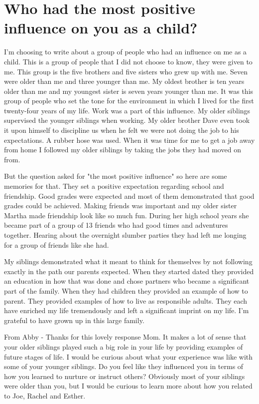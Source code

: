 \section{Who had the most positive influence on you as a child?}
I'm choosing to write about a group of people who had an influence on me as a child.
This is a group of people that I did not choose to know, they were given to me.
This group is the five brothers and five sisters who grew up with me.
Seven were older than me and three younger than me.
My oldest brother is ten years older than me and my youngest sister is seven years younger than me.
It was this group of people who set the tone for the environment in which I lived for the first twenty-four years of my life.
Work was a part of this influence.
My older siblings supervised the younger siblings when working.
My older brother Dave even took it upon himself to discipline us when he felt we were not doing the job to his expectations.
A rubber hose was used.
When it was time for me to get a job away from home I followed my older siblings by taking the jobs they had moved on from.

But the question asked for "the most positive influence" so here are some memories for that.
They set a positive expectation regarding school and friendship.
Good grades were expected and most of them demonstrated that good grades could be achieved.
Making friends was important and my older sister Martha made friendship look like so much fun.
During her high school years she became part of a group of 13 friends who had good times and adventures together.
Hearing about the overnight slumber parties they had left me longing for a group of friends like she had.

My siblings demonstrated what it meant to think for themselves by not following exactly in the path our parents expected.
When they started dated they provided an education in how that was done and chose partners who became a significant part of the family.
When they had children they provided an example of how to parent.
They provided examples of how to live as responsible adults.
They each have enriched my life tremendously and left a significant imprint on my life.
I'm grateful to have grown up in this large family.

From Abby - Thanks for this lovely response Mom.
It makes a lot of sense that your older siblings played such a big role in your life by providing examples of future stages of life.
I would be curious about what your experience was like with some of your younger siblings.
Do you feel like they influenced you in terms of how you learned to nurture or instruct others? Obviously most of your siblings were older than you, but I would be curious to learn more about how you related to Joe, Rachel and Esther.

